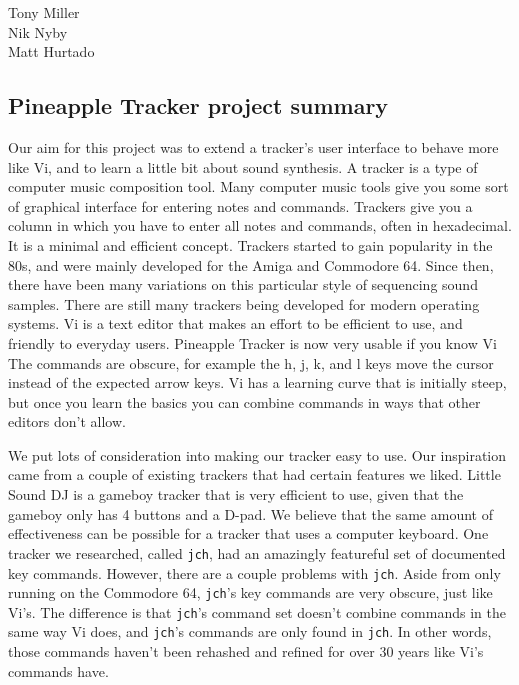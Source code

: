 \documentclass[12pt,letterpaper]{article}
\begin{document}
\begin{flushright}
Tony Miller\\
Nik Nyby\\
Matt Hurtado
\end{flushright}

\begin{center}
\section*{Pineapple Tracker project summary}
\end{center}


\doublespacing

\par
Our aim for this project was to extend a tracker's user interface to behave more like Vi, and to learn a little bit about sound synthesis.
A tracker is a type of computer music composition tool.
Many computer music tools give you some sort of graphical interface for entering notes and commands.
Trackers give you a column in which you have to enter all notes and commands, often in hexadecimal.
It is a minimal and efficient concept.
Trackers started to gain popularity in the 80s, and were mainly developed for the Amiga and Commodore 64.
Since then, there have been many variations on this particular style of sequencing sound samples.
There are still many trackers being developed for modern operating systems.
Vi is a text editor that makes an effort to be efficient to use, and friendly to everyday users.
Pineapple Tracker is now very usable if you know Vi
The commands are obscure, for example the h, j, k, and l keys move the cursor instead of the expected arrow keys.
Vi has a learning curve that is initially steep, but once you learn the basics you can combine commands in ways that other editors don't allow.

\par
We put lots of consideration into making our tracker easy to use.
Our inspiration came from a couple of existing trackers that had certain features we liked.
Little Sound DJ is a gameboy tracker that is very efficient to use, given that the gameboy only has 4 buttons and a D-pad.
We believe that the same amount of effectiveness can be possible for a tracker that uses a computer keyboard.
One tracker we researched, called {\tt jch}, had an amazingly featureful set of documented key commands.
However, there are a couple problems with {\tt jch}.
Aside from only running on the Commodore 64, {\tt jch}'s key commands are very obscure, just like Vi's.
The difference is that {\tt jch}'s command set doesn't combine commands in the same way Vi does, and {\tt jch}'s commands are only found in {\tt jch}.
In other words, those commands haven't been rehashed and refined for over 30 years like Vi's commands have.
\end{document}
